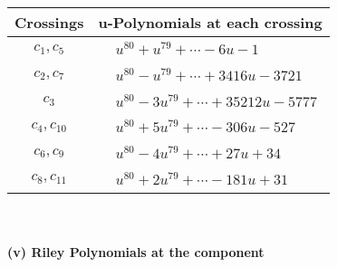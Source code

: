 \documentclass[1p]{elsarticle_modified}
\theoremstyle{definition}
\begin{document}
\begin{tabular}{m{50pt}|m{274pt}}
Crossings & \hspace{64pt}u-Polynomials at each crossing \\
\hline $$\begin{aligned}c_{1},c_{5}\end{aligned}$$&$\begin{aligned}
&u^{80}+u^{79}+\cdots-6 u-1
\end{aligned}$\\
\hline $$\begin{aligned}c_{2},c_{7}\end{aligned}$$&$\begin{aligned}
&u^{80}- u^{79}+\cdots+3416 u-3721
\end{aligned}$\\
\hline $$\begin{aligned}c_{3}\end{aligned}$$&$\begin{aligned}
&u^{80}-3 u^{79}+\cdots+35212 u-5777
\end{aligned}$\\
\hline $$\begin{aligned}c_{4},c_{10}\end{aligned}$$&$\begin{aligned}
&u^{80}+5 u^{79}+\cdots-306 u-527
\end{aligned}$\\
\hline $$\begin{aligned}c_{6},c_{9}\end{aligned}$$&$\begin{aligned}
&u^{80}-4 u^{79}+\cdots+27 u+34
\end{aligned}$\\
\hline $$\begin{aligned}c_{8},c_{11}\end{aligned}$$&$\begin{aligned}
&u^{80}+2 u^{79}+\cdots-181 u+31
\end{aligned}$\\
\hline
\end{tabular}\\~\\
\newpage\renewcommand{\arraystretch}{1}
\flushleft \textbf{(v) Riley Polynomials at the component}\newline \\
\end{document}
